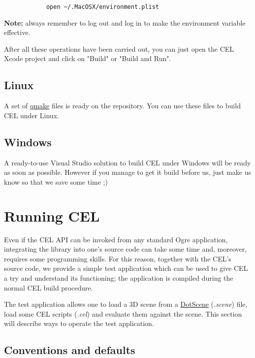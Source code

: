 		\begin{verbatim}
			open ~/.MacOSX/environment.plist
		\end{verbatim}

		\noindent
		\textbf{Note:} always remember to log out and log in to make the environment variable effective.
		
		After all these operations have been carried out, you can just open the CEL Xcode project and click on "Build" or
		"Build and Run".

	\subsection{Linux}
	
		A set of \href{http://doc.trolltech.com/4.2/qmake-manual.html}{qmake} files is ready on the repository. You can use these files to
		build CEL under Linux.
		
	\subsection{Windows}
	
	    A ready-to-use Visual Studio solution to build CEL under Windows will be ready as soon as possible. However if you manage to get it
	    build before us, just make us know so that we save some time ;)
	    
	    
\section{Running CEL} \label{test}

    Even if the CEL API can be invoked from any standard Ogre application, integrating the library into one's source code can take some time and, moreover, requires some programming skills. For this reason, together with the CEL's source code, we provide a simple test application which can be used to give CEL a try and understand its functioning; the application is compiled during the normal CEL build procedure.

    The test application allows one to load a 3D scene from a \href{http://www.ogre3d.org/tikiwiki/DotScene}{DotScene} (\emph{.scene}) file, load some CEL scripts (\emph{.cel}) and evaluate them against the scene. This section will describe ways to operate the test application.

    	\subsection{Conventions and defaults}

